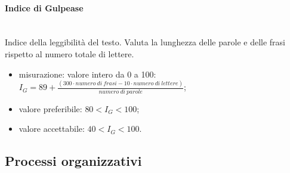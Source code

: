 			\paragraph*{Indice di Gulpease}\mbox{}\\
			Indice della leggibilità del testo. Valuta la lunghezza delle parole e delle frasi rispetto al numero totale di lettere. 
			\begin{itemize}
				\item misurazione: valore intero da 0 a 100:\newline 	
				$I_G = 89+ \frac{(300 \cdot numero\ di\ frasi - 10 \cdot numero\ di\ lettere)}{numero\ di\ parole}$;	
				\item valore preferibile: $80 < I_G < 100$;
				\item valore accettabile: $40 < I_G < 100$.
			\end{itemize}

	\begin{comment}		
	\subsection{Processi organizzativi}
	
	\subsubsection{Gestione della qualità}
		\paragraph{Metriche}
			\subparagraph{PMS: Percentuale di metriche soddisfatte}
			La percentuale di metriche soddisfatte valuta quante metriche raggiungono soglie accettabili sul numero totale delle metriche calcolate. Una bassa percentuale di soddisfazione può indicare poca qualità, metriche inadeguate o mancata correttezza nel calcolo.
			\begin{itemize}
				\item misurazione: $\frac{numero\ di\ metriche\ soddisfatte}{numero\ di\ metriche\ totali} $;
				\item valore preferibile: $ \geq 80\%$;
				\item valore accettabile: $ \geq 60\%$.
			\end{itemize}
	\end{comment}
\subsection{Processi organizzativi}
